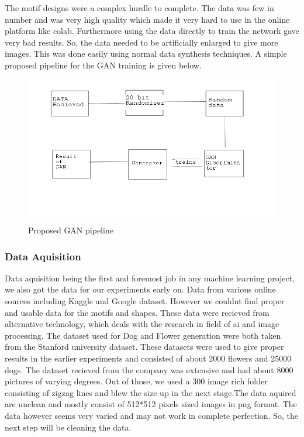 \documentclass{article}
\begin{document}
    The motif designs were a complex hurdle to complete. The data was few in number and was very high quality which made it very hard to use in the online platform like colab. Furthermore using the data directly to train the network gave very bad results. So, the data needed to be artificially enlarged to give more images. This was done easily using normal data synthesis techniques. A simple proposed pipeline for the GAN training is given below.
    
    \begin{figure}[h]
        \centering
        \includegraphics{images/Generalworkflow.png}
        \caption{Proposed GAN pipeline}
    \end{figure}
    
    \subsubsection{Data Aquisition}
    Data aquisition being the first and foremost job in any machine learning project, we also got the data for our experiments early on. Data from various online sources including Kaggle and Google dataset. However we couldnt find proper and usable data for the motifs and shapes. These data were recieved from alternative technology, which deals with the research in field of ai and image processing.
    The dataset used for Dog and Flower generation were both taken from the Stanford university dataset. These datasets were used to give proper results in the earlier experiments and consisted of about 2000 flowers and 25000 dogs.
    The dataset recieved from the company was extensive and had about 8000 pictures of varying degrees. Out of those, we used a 300 image rich folder consisting of zigzag lines and blew the size up in the next stage.The data aquired are unclean and mostly consist of 512*512 pixels sized images in png format. The data however seems very varied and may not work in complete perfection. So, the next step will be cleaning the data.
    
\end{document}
